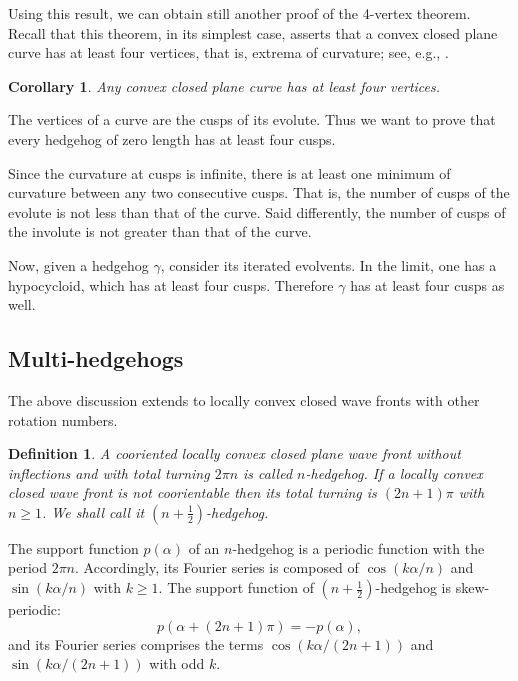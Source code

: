 \documentclass[12pt]{article}
\makeatletter
\newtheorem{corollary}[lemma]{Corollary}
\newtheorem{definition}[lemma]{Definition}
\renewenvironment{proof}[1][\proofname] 
{\par\pushQED{\qed}\normalfont\topsep6\p@\@plus6\p@\relax\trivlist\item[\hskip\labelsep\bfseries#1\@addpunct{.}]\ignorespaces}{\popQED\endtrivlist\@endpefalse}
\newcommand{\g}{{\gamma}}
\makeatother
\begin{document}
Using this result, we can obtain still another proof of the 4-vertex theorem. Recall that this theorem, in its simplest case,  asserts that a convex closed plane curve has at least four vertices, that is, extrema of curvature; see, e.g., \cite{FT}.

\begin{corollary} Any convex closed plane curve has at least four vertices. \end{corollary}  

\begin{proof} The vertices of a curve are the cusps of its evolute. Thus we want to prove that every hedgehog of zero length has at least four cusps. 
	
Since the curvature at cusps is infinite, there is at least one minimum of curvature  between any two consecutive cusps. That is, the number of cusps of the evolute is not less than that of the curve. Said differently, the number of cusps of the involute is not greater than that of the curve.
	
Now, given a hedgehog $\g$, consider its iterated evolvents. In the limit, one has a hypocycloid, which has at least four cusps. Therefore $\g$ has at least four cusps as well. \end{proof}

\subsection{Multi-hedgehogs} \label{smooth-rotation}

The above discussion extends to locally convex closed wave fronts with other rotation numbers. 

\begin{definition}\label{multi-hedgehog} A cooriented locally convex closed plane wave front without inflections and with total turning $2\pi n$ is called \emph{$n$-hedgehog}. If a locally convex closed wave front is not coorientable then its total turning is $(2n+1)\pi$ with $n\ge 1$. We shall call it \emph{$\left(n+\frac12\right)$-hedgehog}.\end{definition}
The support function $p(\alpha)$ of an $n$-hedgehog is a periodic function with the period $2\pi n$. Accordingly, its Fourier series is composed of $\cos(k\alpha/n)$ and $\sin(k\alpha/n)$ with $k\ge 1$. 
The support function of $\left(n+\frac12\right)$-hedgehog is skew-periodic: $$p(\alpha + (2n+1)\pi)=-p(\alpha),$$and its Fourier series comprises the terms $\cos(k\alpha/(2n+1))$ and $\sin(k\alpha/(2n+1))$ with odd $k$. 
\end{document}
